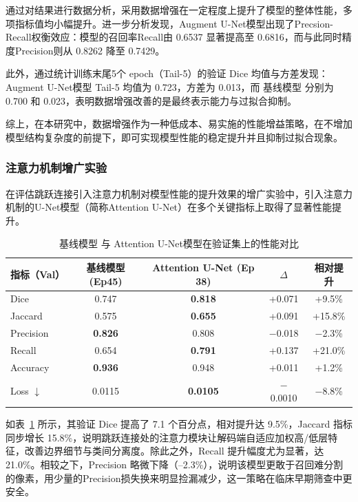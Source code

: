 通过对结果进行数据分析，采用数据增强在一定程度上提升了模型的整体性能，多项指标值均小幅提升。进一步分析发现，Augment U-Net模型出现了Precsion-Recall权衡效应：模型的召回率Recall由 0.6537 显著提高至 0.6816，而与此同时精度Precision则从 0.8262 降至 0.7429。

此外，通过统计训练末尾5个 epoch（Tail-5）的验证 Dice 均值与方差发现：Augment U-Net模型 Tail-5 均值为 0.723，方差为 0.013，而 基线模型 分别为 0.700 和 0.023，表明数据增强改善的是最终表示能力与过拟合抑制。

综上，在本研究中，数据增强作为一种低成本、易实施的性能增益策略，在不增加模型结构复杂度的前提下，即可实现模型性能的稳定提升并且抑制过拟合现象。

\subsubsection{注意力机制增广实验}

在评估跳跃连接引入注意力机制对模型性能的提升效果的增广实验中，引入注意力机制的U-Net模型（简称Attention U-Net）在多个关键指标上取得了显著性能提升。

\begin{table}[htbp]
    \centering
    \caption{基线模型 与 Attention U-Net模型在验证集上的性能对比}
    \label{tab:att_unet}
    \begin{tabular}{lcccc}
        \toprule
        指标（Val） & 基线模型 (Ep45) & Attention U-Net (Ep 38) &  $\Delta$ & 相对提升 \\
        \midrule
        Dice        & 0.747 & \textbf{0.818} & +0.071 & +9.5\% \\
        Jaccard     & 0.575 & \textbf{0.655} & +0.091 & +15.8\% \\
        Precision   & \textbf{0.826} & 0.808 & $-$0.018 & $-$2.3\% \\
        Recall      & 0.654 & \textbf{0.791} & +0.137 & +21.0\% \\
        Accuracy    & \textbf{0.936} & 0.948 & +0.011 & +1.2\% \\
        Loss $\downarrow$ & 0.0115 & \textbf{0.0105} & $-$0.0010 & $-$8.8\% \\
        \bottomrule
    \end{tabular}
\end{table}

如表~\ref{tab:att_unet} 所示，其验证 Dice 提高了 7.1 个百分点，相对提升达 9.5\%，Jaccard 指标同步增长 15.8\%，说明跳跃连接处的注意力模块让解码端自适应加权高/低层特征，改善边界细节与类间分离度。除此之外，Recall 提升幅度尤为显著，达 21.0\%。相较之下，Precision 略微下降（–2.3\%），说明该模型更敢于召回难分割的像素，用少量的Precision损失换来明显捡漏减少，这一策略在临床早期筛查中更安全。

